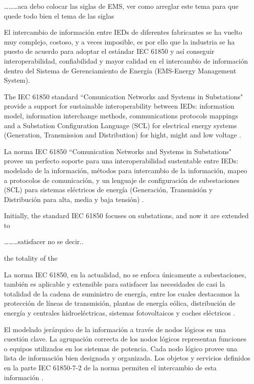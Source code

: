 \ldots\ldots\ldots aca debo colocar las siglas de EMS, ver como
arreglar este tema para que quede todo bien el tema de las siglas
  

El intercambio de informaci\'on entre IEDs de diferentes fabricantes 
se ha vuelto muy complejo, costoso, y a veces imposible, es por ello 
que la industria se ha puesto de acuerdo para adoptar el est\'andar 
IEC 61850 y as\'i conseguir interoperabilidad, confiabilidad y mayor 
calidad en el intercambio de informaci\'on dentro del Sistema de 
Gerenciamiento de Energ\'ia (EMS-Energy Management System). 

The IEC 61850 standard ``Comunication Networks and Systems in Substations" 
provide a support for sustainable interoperability between IEDs: 
information model, information interchange methods, communications 
protocols mappings and a Substation Configuration Language (SCL) 
for electrical energy systems (Generation, Transmission and Distribution) 
for hight, might and low voltage \cite{Schwarz2008}. 

La norma IEC 61850 ``Comunication Networks and Systems in Substations" 
provee un perfecto soporte para una interoperabilidad sustentable entre 
IEDs: modelado de la informaci\'on, m\'etodos para intercambio de la 
informaci\'on, mapeo a protocolos de comunicaci\'on, y un lenguaje de 
configuraci\'on de subestaciones (SCL) para sistemas el\'ectricos de 
energ\'ia (Generaci\'on, Transmisi\'on y Distribuci\'on para alta, 
media y baja tensi\'on) \cite{Schwarz2008}. 

Initially, the standard IEC 61850 focuses on substations, 
and now it are extended to 

\ldots\ldots\ldots satisfacer no se decir..

the totality of the 

La norma IEC 61850, en la actualidad, no se enfoca \'unicamente a 
subestaciones, tambi\'en es aplicable y extensible para satisfacer 
las necesidades de casi la totalidad de la cadena de suministro de 
energ\'ia, entre los cuales destacamos la protecci\'on de l\'ineas de 
transmisi\'on, plantas de energ\'ia e\'olica, distribuci\'on de 
energ\'ia y centrales hidroel\'ectricas, sistemas fotovoltaicos y 
coches el\'ectricos \cite{Schwarz2005, DER2009, German2009}. 

El modelado jer\'arquico de la informaci\'on a trav\'es de nodos 
l\'ogicos es una cuesti\'on clave. La agrupaci\'on correcta de los 
nodos l\'ogicos representan funciones o equipos utilizados en los 
sistemas de potencia. Cada nodo l\'ogico provee una lista de informaci\'on 
bien designada y organizada. Los objetos y servicios definidos en la parte 
IEC 61850-7-2 de la norma permiten el intercambio de esta 
informaci\'on \cite{TC572004}.

